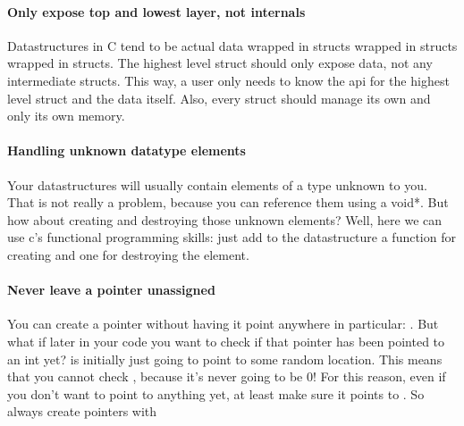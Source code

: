 \paragraph{Only expose top and lowest layer, not internals} Datastructures in C tend to be actual data wrapped in structs wrapped in structs wrapped in structs. The highest level struct should only expose data, not any intermediate structs. This way, a user only needs to know the api for the highest level struct and the data itself. Also, every struct should manage its own and only its own memory.

\paragraph{Handling unknown datatype elements} Your datastructures will usually contain elements of a type unknown to you. That is not really a problem, because you can reference them using a void*. But how about creating and destroying those unknown elements? Well, here we can use c's functional programming skills: just add to the datastructure a function for creating and one for destroying the element.

\paragraph{Never leave a pointer unassigned} You can create a pointer without having it point anywhere in particular: . But what if later in your code you want to check if that pointer has been pointed to an int yet?  is initially just going to point to some random location. This means that you cannot check , because it's never going to be 0! For this reason, even if you don't want  to point to anything yet, at least make sure it points to . So always create pointers with 
